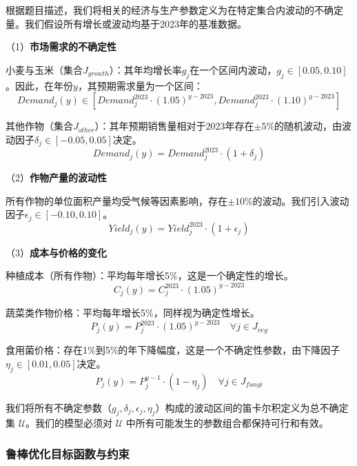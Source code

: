 \documentclass[withoutpreface,bwprint]{cumcmthesis} %
\begin{document}
根据题目描述，我们将相关的经济与生产参数定义为在特定集合内波动的不确定量。我们假设所有增长或波动均基于2023年的基准数据。

（1）\textbf{市场需求的不确定性}


小麦与玉米（集合$J_{growth}$）：其年均增长率$g_j$在一个区间内波动，$g_j \in [0.05, 0.10]$。因此，在年份$y$，其预期需求量为一个区间：
\begin{equation}
	Demand_j(y) \in [Demand_j^{2023} \cdot (1.05)^{y-2023}, Demand_j^{2023} \cdot (1.10)^{y-2023}]
\end{equation}

其他作物（集合$J_{other}$）：其年预期销售量相对于2023年存在$\pm5\%$的随机波动，由波动因子$\delta_j \in [-0.05, 0.05]$决定。
\begin{equation}
	Demand_j(y) = Demand_j^{2023} \cdot (1 + \delta_j)
\end{equation}


（2）\textbf{作物产量的波动性}


所有作物的单位面积产量均受气候等因素影响，存在$\pm10\%$的波动。我们引入波动因子$\epsilon_j \in [-0.10, 0.10]$。
\begin{equation}
	Yield_j(y) = Yield_j^{2023} \cdot (1 + \epsilon_j)
\end{equation}


（3）\textbf{成本与价格的变化}


种植成本（所有作物）：平均每年增长5\%，这是一个确定性的增长。
\begin{equation}
	C_j(y) = C_j^{2023} \cdot (1.05)^{y-2023}
\end{equation}

蔬菜类作物价格：平均每年增长5\%，同样视为确定性增长。
\begin{equation}
	P_j(y) = P_j^{2023} \cdot (1.05)^{y-2023} \quad \forall j \in J_{veg}
\end{equation}

食用菌价格：存在1\%到5\%的年下降幅度，这是一个不确定性参数，由下降因子$\eta_j \in [0.01, 0.05]$决定。
\begin{equation}
	P_j(y) = P_j^{y-1} \cdot (1 - \eta_j) \quad \forall j \in J_{fungi}
\end{equation}


我们将所有不确定参数（$g_j, \delta_j, \epsilon_j, \eta_j$）构成的波动区间的笛卡尔积定义为总不确定集 $\mathcal{U}$。我们的模型必须对 $\mathcal{U}$ 中所有可能发生的参数组合都保持可行和有效。

\subsubsection{鲁棒优化目标函数与约束}
\end{document}
